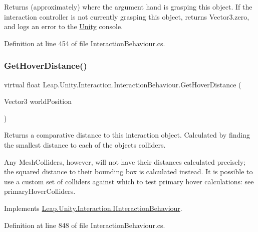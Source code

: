 Returns (approximately) where the argument hand is grasping this object. If the interaction controller is not currently grasping this object, returns Vector3.\+zero, and logs an error to the \mbox{\hyperlink{namespace_leap_1_1_unity}{Unity}} console. 



Definition at line 454 of file Interaction\+Behaviour.\+cs.

\mbox{\label{class_leap_1_1_unity_1_1_interaction_1_1_interaction_behaviour_a0f5248395ddcbab62086bd9d2f620d80}} 
\subsubsection{\texorpdfstring{GetHoverDistance()}{GetHoverDistance()}}
{\footnotesize\ttfamily virtual float Leap.\+Unity.\+Interaction.\+Interaction\+Behaviour.\+Get\+Hover\+Distance (\begin{DoxyParamCaption}\item[{Vector3}]{world\+Position }\end{DoxyParamCaption})\hspace{0.3cm}{\ttfamily [virtual]}}



Returns a comparative distance to this interaction object. Calculated by finding the smallest distance to each of the object\textquotesingle{}s colliders. 

Any Mesh\+Colliders, however, will not have their distances calculated precisely; the squared distance to their bounding box is calculated instead. It is possible to use a custom set of colliders against which to test primary hover calculations\+: see primary\+Hover\+Colliders. 

Implements \mbox{\hyperlink{interface_leap_1_1_unity_1_1_interaction_1_1_i_interaction_behaviour_a5f314b48c8c3b8f6f5067bcf5a97003c}{Leap.\+Unity.\+Interaction.\+I\+Interaction\+Behaviour}}.



Definition at line 848 of file Interaction\+Behaviour.\+cs.

\mbox{\label{class_leap_1_1_unity_1_1_interaction_1_1_interaction_behaviour_a294a2ea9c5524c0c8460006df32371b2}} 
